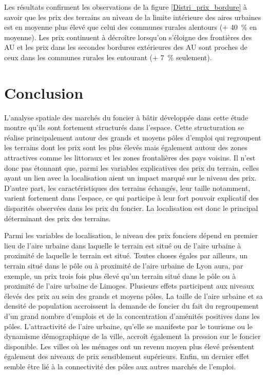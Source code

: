\documentclass[10.5pt,a4paper]{article}
\makeatletter
\newcommand\cadreblanc[3]{
\noindent
\begin{tikzpicture}[overlay, remember picture]
\shade[top color=vert_n,bottom color=light_vert_n] 
(current page.south west) rectangle (current page.north east);
\node[minimum width=4.50cm, minimum height = 4.50cm, draw=white, line width = 10pt] at (16.08,-24.48) {};
\node[] at (16.08,-24.58) {\calibri \color{white} \bfseries \fontsize{96}{96}\selectfont >};
\node[minimum width=15.65cm, minimum height = 15.65cm, draw=white, line width = 10pt] at (10.5,-10.2) {
\begin{minipage}[t]{1.15cm}
\hfill
\end{minipage}\hfill
\begin{minipage}[t]{9.6cm}
\vspace{12mm}
\color{white} \fontsize{16}{7}\selectfont \textls[-5]{#1

\rule{2cm}{5pt}
} 
\vspace{4mm}

\color{white} \sloppy \raggedright \fontsize{35}{35}\selectfont \bfseries \textls[-10]{#2} 
\vspace{20.5mm}

\color{white} \fontsize{11}{12}\selectfont \textls[-10]{#3}
\vspace{14mm}
\end{minipage}\hfill
\begin{minipage}[t]{4.50cm}
\hfill
\end{minipage}\hfill
};
\end{tikzpicture}
}
\renewcommand\thesection{\arabic{section}}
\newcommand\invisiblesection[1]{%
  \refstepcounter{section}%
  \def\@currentlabelname{#1}
  \addcontentsline{toc}{section}{\protect\numberline{\thesection}#1}%
  \sectionmark{#1}}
\makeatother
\begin{document}
{\newpage



Les résultats confirment les observations de la figure \ref{Distri_prix_bordure} à savoir que les prix des terrains au niveau de la limite intérieure des aires urbaines est en moyenne plus élevé que celui des communes rurales alentours (+ 40~\% en moyenne). Les prix continuent à décroître lorsqu'on s'éloigne des frontières des AU et les prix dans les secondes bordures extérieures des AU sont proches de ceux dans les communes rurales les entourant (+ 7~\% seulement).\par


\cleardoublepage


\section{Conclusion}\label{sec:marker6}


L'analyse spatiale des marchés du foncier à bâtir développée dans cette étude montre qu'ils sont fortement structurés dans l’espace. Cette structuration se réalise principalement autour des grands et moyens pôles d’emploi qui regroupent les terrains dont les prix sont les plus élevés mais également autour des zones attractives comme les littoraux et les zones frontalières des pays voisins. Il n'est donc pas étonnant que, parmi les variables explicatives des prix du terrain, celles ayant un lien avec la localisation aient un impact marqué sur le niveau des prix. D'autre part, les caractéristiques des terrains échangés, leur taille notamment, varient fortement dans l'espace, ce qui participe à leur fort pouvoir explicatif des disparités observées dans les prix du foncier. La localisation est donc le principal déterminant des prix des terrains. \par  

Parmi les variables de localisation, le niveau des prix fonciers dépend en premier lieu de l'aire urbaine dans laquelle le terrain est situé ou de l'aire urbaine à proximité de laquelle le terrain est situé. Toutes choses égales par ailleurs, un terrain situé dans le pôle ou à proximité de l'aire urbaine de Lyon aura, par exemple, un prix trois fois plus élevé qu'un terrain situé dans le pôle ou à proximité de l'aire urbaine de Limoges. Plusieurs effets participent aux niveaux élevés des prix au sein des grands et moyens pôles. La taille de l'aire urbaine et sa densité de population accroissent la demande de foncier du fait du regroupement d'un grand nombre d'emplois et de la concentration d'aménités positives dans les pôles. L'attractivité de l'aire urbaine, qu'elle se manifeste par le tourisme ou le dynamisme démographique de la ville, accroît également la pression sur le foncier disponible. Les villes où les ménages ont un revenu moyen plus élevé présentent également des niveaux de prix sensiblement supérieurs. Enfin, un dernier effet semble être lié à la connectivité des pôles aux autres marchés de l'emploi. \par  

}
\end{document}
